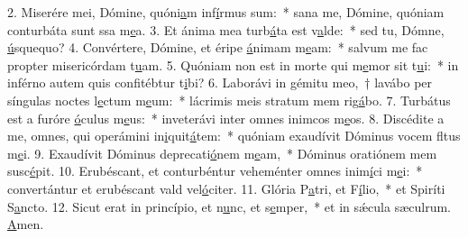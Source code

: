 2. Miserére mei, Dómine, quóni\uline{a}m inf\uline{í}rmus sum:~* sana me, Dómine, quóniam conturbáta sunt ssa m\uline{e}a.
3. Et ánima mea turb\uline{á}ta est v\uline{a}lde:~* sed tu, Dómne, \uline{ú}squequo?
4. Convértere, Dómine, et éripe \uline{á}nimam m\uline{e}am:~* salvum me fac propter misericórdam t\uline{u}am.
5. Quóniam non est in morte qui m\uline{e}mor sit t\uline{u}i:~* in inférno autem quis confitébtur t\uline{i}bi?
6. Laborávi in gémitu meo,~† lavábo per síngulas noctes l\uline{e}ctum m\uline{e}um:~* lácrimis meis stratum mem rig\uline{á}bo.
7. Turbátus est a furóre \uline{ó}culus m\uline{e}us:~* inveterávi inter omnes inimcos m\uline{e}os.
8. Discédite a me, omnes, qui operámini in\uline{i}quit\uline{á}tem:~* quóniam exaudívit Dóminus vocem fltus m\uline{e}i.
9. Exaudívit Dóminus deprecati\uline{ó}nem m\uline{e}am,~* Dóminus oratiónem mem susc\uline{é}pit.
10. Erubéscant, et conturbéntur veheménter omnes inim\uline{í}ci m\uline{e}i:~* convertántur et erubéscant vald vel\uline{ó}citer.
11. Glória P\uline{a}tri, et F\uline{í}lio,~* et Spiríti S\uline{a}ncto.
12. Sicut erat in princípio, et n\uline{u}nc, et s\uline{e}mper,~* et in sǽcula sæculrum. \uline{A}men.
